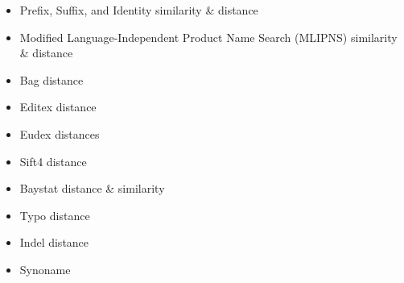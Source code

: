 \documentclass[12pt,a4paper]{article}
\begin{document}
\begin{itemize}
		\item Prefix, Suffix, and Identity similarity \& distance
		\item Modified Language-Independent Product Name Search (MLIPNS) similarity \& distance
		\item Bag distance
		\item Editex distance
		\item Eudex distances
		\item Sift4 distance
		\item Baystat distance \& similarity
		\item Typo distance
		\item Indel distance
		\item Synoname
	\end{itemize}	

	
	
	
\end{document}
